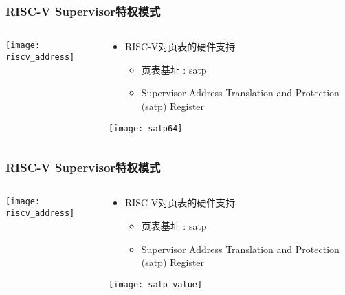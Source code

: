 \begin{frame}   
	\frametitle{RISC-V Supervisor特权模式}
	
	\begin{columns}[t]
		
		\begin{column}{.5\textwidth}
			
			\texttt{[image: riscv\_address]}
			
		\end{column}
		
		
		\begin{column}{.5\textwidth}
			
			\begin{itemize}\large
				\item RISC-V对页表的硬件支持
				\begin{itemize}
					\item 页表基址 : satp
					\item  Supervisor Address Translation and Protection (satp) Register
					
					
				\end{itemize}
			\end{itemize}
             \texttt{[image: satp64]}
		\end{column}
		
		
	\end{columns}
	
\end{frame}


\begin{frame}   
	\frametitle{RISC-V Supervisor特权模式}
	
	\begin{columns}[t]
		
		\begin{column}{.5\textwidth}
			
			\texttt{[image: riscv\_address]}
			
		\end{column}
		
		
		\begin{column}{.5\textwidth}
			
			\begin{itemize}\large
				\item RISC-V对页表的硬件支持
				\begin{itemize}
					\item 页表基址 : satp
					\item  Supervisor Address Translation and Protection (satp) Register
					
					
				\end{itemize}
			\end{itemize}
			\texttt{[image: satp-value]}
		\end{column}
		
		
	\end{columns}
	
\end{frame}



